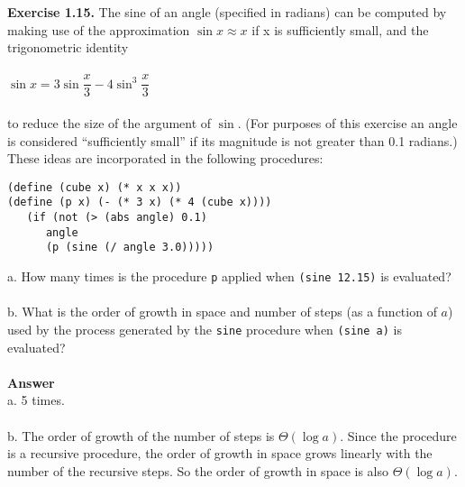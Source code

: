 \documentclass[12pt,a4paper]{article}
\begin{document}
\noindent \textbf{Exercise 1.15.} The sine of an angle (specified in radians) can be computed by making use of the approximation $\sin x \approx  x$ if x is sufficiently small, and the trigonometric identity\\\\
$\sin x = 3\sin {\dfrac{x}{3}}-4{\sin ^3 {\dfrac{x}{3}}}$\\\\
to reduce the size of the argument of $\sin$. (For purposes of this exercise an angle is considered ``sufficiently small'' if its magnitude is not greater than 0.1 radians.) These ideas are incorporated in the following procedures:
\begin{verbatim}
(define (cube x) (* x x x))
(define (p x) (- (* 3 x) (* 4 (cube x))))
   (if (not (> (abs angle) 0.1)
      angle
      (p (sine (/ angle 3.0)))))
\end{verbatim}
a. How many times is the procedure \verb|p| applied when \verb|(sine 12.15)| is evaluated?\\\\
b. What is the order of growth in space and number of steps (as a function of $a$) used by the process generated by the \verb|sine| procedure when \verb|(sine a)| is evaluated?\\\\
\textbf{Answer}\\
a. 5 times.\\\\
b. The order of growth of the number of steps is $\Theta (\log a)$. Since the procedure is a recursive procedure, the order of growth in space grows linearly with the number of the recursive steps. So the order of growth in space is also $\Theta(\log a)$.
\end{document}
